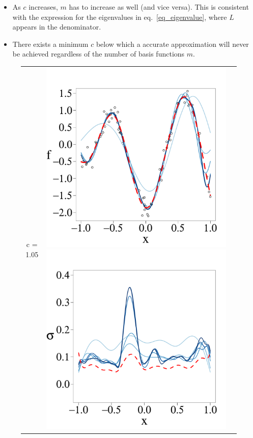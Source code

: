 \documentclass[onecolumn,a4paper,11pt]{article}
\begin{document}
\begin{itemize}
\item As $c$ increases, $m$ has to increase as well (and vice versa). This is consistent with the expression for the eigenvalues in eq.~\eqref{eq_eigenvalue}, where $L$ appears in the denominator.
\item There exists a minimum $c$ below which a accurate approximation will never be achieved regardless of the number of basis functions $m$.
\end{itemize}


\begin{figure}
\centering
\begin{tabular}{ c c c }
\arrayrulecolor{darkgray}\hline
c = 1.05 &
\includegraphics[scale=0.215, trim = 0mm 14mm 0mm 14mm, clip]{ch5_fig3_Post_part1.pdf}
\includegraphics[scale=0.215, trim = 0mm 14mm 0mm 14mm, clip]{ch5_fig3_Sigma_part1.pdf} 

\end{tabular}
\end{figure}
\end{document}

